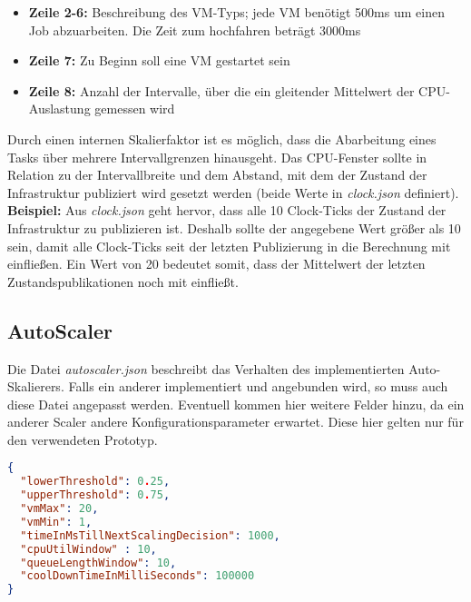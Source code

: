\begin{itemize}
	\item \textbf{Zeile 2-6:} Beschreibung des VM-Typs; jede VM benötigt 500ms um einen Job abzuarbeiten. Die Zeit zum hochfahren beträgt 3000ms
	\item \textbf{Zeile 7:} Zu Beginn soll eine VM gestartet sein
	\item \textbf{Zeile 8:} Anzahl der Intervalle, über die ein gleitender Mittelwert der CPU-Auslastung gemessen wird  
	
\end{itemize}
Durch einen internen Skalierfaktor ist es möglich, dass die Abarbeitung eines Tasks über mehrere Intervallgrenzen hinausgeht. Das CPU-Fenster sollte in Relation zu der Intervallbreite und dem Abstand, mit dem der Zustand der Infrastruktur publiziert wird gesetzt werden (beide Werte in \textit{clock.json} definiert). \\
\textbf{Beispiel:} Aus \textit{clock.json} geht hervor, dass alle 10 Clock-Ticks der Zustand der Infrastruktur zu publizieren ist. Deshalb sollte der angegebene Wert größer als 10 sein, damit alle Clock-Ticks seit der letzten Publizierung in die Berechnung mit einfließen. Ein Wert von 20 bedeutet somit, dass der Mittelwert der letzten Zustandspublikationen noch mit einfließt.


\subsection{AutoScaler}
Die Datei \textit{autoscaler.json} beschreibt das Verhalten des implementierten Auto-Skalierers. Falls ein anderer implementiert und angebunden wird, so muss auch diese Datei angepasst werden. Eventuell kommen hier weitere Felder hinzu, da ein anderer Scaler andere Konfigurationsparameter erwartet. Diese hier gelten nur für den verwendeten Prototyp.








\begin{lstlisting}[language=json,firstnumber=1, caption={autoscaler.json}]
{
  "lowerThreshold": 0.25,
  "upperThreshold": 0.75,
  "vmMax": 20,
  "vmMin": 1,
  "timeInMsTillNextScalingDecision": 1000,
  "cpuUtilWindow" : 10,
  "queueLengthWindow": 10,
  "coolDownTimeInMilliSeconds": 100000
}
\end{lstlisting}

